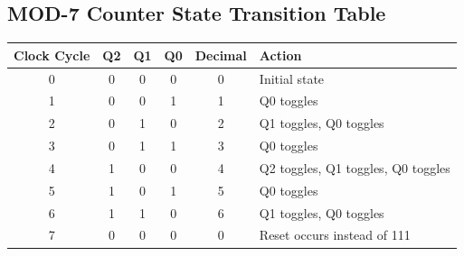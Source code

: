\documentclass{article}
\begin{document}
\subsection{MOD-7 Counter State Transition Table}
\begin{tcolorbox}[colback=boxbg,colframe=titlebg,title=MOD-7 Counter State Transition Table,breakable]
\centering
\begin{tabular}{|c|c|c|c|c|l|}
\hline
Clock Cycle & Q2 & Q1 & Q0 & Decimal & Action \\ \hline
0 & 0 & 0 & 0 & 0 & Initial state \\ \hline
1 & 0 & 0 & 1 & 1 & Q0 toggles \\ \hline
2 & 0 & 1 & 0 & 2 & Q1 toggles, Q0 toggles \\ \hline
3 & 0 & 1 & 1 & 3 & Q0 toggles \\ \hline
4 & 1 & 0 & 0 & 4 & Q2 toggles, Q1 toggles, Q0 toggles \\ \hline
5 & 1 & 0 & 1 & 5 & Q0 toggles \\ \hline
6 & 1 & 1 & 0 & 6 & Q1 toggles, Q0 toggles \\ \hline
7 & 0 & 0 & 0 & 0 & Reset occurs instead of 111 \\ \hline
\end{tabular}
\end{tcolorbox}
\end{document}
